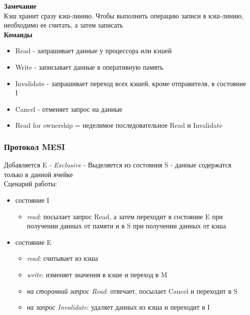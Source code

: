 \documentclass[12pt]{article}
\begin{document}
\textbf{Замечание}\\
Кэш хранит сразу кэш-линию. Чтобы выполнить операцию записи в кэш-линию, необходимо ее считать, а затем записать\\
\textbf{Команды}
\begin{itemize}
    \item Read - запрашивает данные у процессора или кэшей
    \item Write - записывает данные в оперативную память
    \item Invalidate - запрашивает переход всех кэшей, кроме отправителя, в состояние I
    \item Cancel - отменяет запрос на данные
    \item Read for ownership = неделимое последовательное Read и Invalidate
\end{itemize}
\subsubsection{Протокол MESI}
Добавляется E - \textit{Exclusive} - Выделяется из состояния S - данные содержатся только в данной ячейке\\
Сценарий работы:
\begin{itemize}
    \item состояние I
    \begin{itemize}
        \item \textit{read}: посылает запрос Read, а затем переходит в состояние E при получении данных от памяти и в S при получении данных от кэша
    \end{itemize}
    \item состояние E
    \begin{itemize}
        \item \textit{read}: считывает из кэша
        \item \textit{write}: изменяет значения в кэше и переход в M
        \item \textit{на сторонний запрос Read}: отвечает, посылает Cancel и переходит в S
        \item \textit{на запрос Invalidate}: удаляет данных из кэша и переходит в I
    \end{itemize}
\end{itemize}
\end{document}
